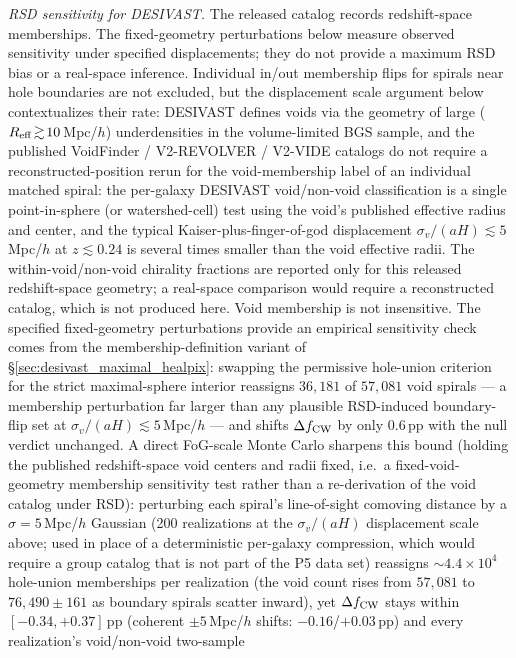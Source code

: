 \documentclass[aps,prd,twocolumn,superscriptaddress,showpacs,preprintnumbers,nofootinbib,longbibliography,floatfix]{revtex4-2}
\begin{document}
\emph{RSD sensitivity for DESIVAST.} The released catalog records
redshift-space memberships. The fixed-geometry perturbations below
measure observed sensitivity under specified displacements; they do
not provide a maximum RSD bias or a real-space inference. Individual
in/out membership flips for
spirals near hole boundaries are not excluded, but the displacement
scale argument below contextualizes their rate: DESIVAST defines voids via the geometry of large
($R_{\rm eff}\!\gtrsim\!10$\,Mpc/$h$) underdensities in the
volume-limited BGS sample, and the published VoidFinder /
V2-REVOLVER / V2-VIDE catalogs do not require a
reconstructed-position rerun for the void-membership label of an
individual matched spiral: the per-galaxy DESIVAST void/non-void
classification is a single point-in-sphere (or watershed-cell)
test using the void's published effective radius and center, and
the typical Kaiser-plus-finger-of-god displacement $\sigma_v/(aH)
\lesssim 5$\,Mpc/$h$ at $z \lesssim 0.24$ is several times smaller
than the void effective radii. The within-void/non-void chirality
fractions are reported only for this released redshift-space geometry;
a real-space comparison would require a reconstructed catalog, which is
not produced here. Void membership is not insensitive. The specified
fixed-geometry perturbations provide an empirical sensitivity check
comes from the membership-definition variant of
\S\ref{sec:desivast_maximal_healpix}: swapping the permissive
hole-union criterion for the strict maximal-sphere interior reassigns
$36{,}181$ of $57{,}081$ void spirals --- a membership perturbation
far larger than any plausible RSD-induced boundary-flip set at
$\sigma_v/(aH) \lesssim 5$\,Mpc/$h$ --- and shifts
$\Delta f_{\rm CW}$ by only $0.6$\,pp with the null verdict
unchanged. A direct FoG-scale Monte Carlo sharpens this bound
(holding the published redshift-space void centers and radii fixed,
i.e.\ a fixed-void-geometry membership sensitivity test rather than a
re-derivation of the void catalog under RSD):
perturbing each spiral's line-of-sight comoving distance by a
$\sigma\!=\!5$\,Mpc/$h$ Gaussian (200 realizations at the
$\sigma_v/(aH)$ displacement scale above; used in place of a
deterministic per-galaxy compression, which would require a group
catalog that is not part of the P5 data set) reassigns
$\sim\!4.4\times10^{4}$ hole-union memberships per realization (the
void count rises from $57{,}081$ to $76{,}490 \pm 161$ as boundary
spirals scatter inward), yet $\Delta f_{\rm CW}$ stays within
$[-0.34, +0.37]$\,pp (coherent $\pm 5$\,Mpc/$h$ shifts:
$-0.16$/$+0.03$\,pp) and every realization's void/non-void two-sample
\end{document}
